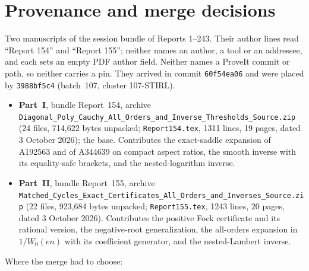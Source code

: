 \documentclass[11pt,letterpaper]{article}
\numberwithin{equation}{section}
\theoremstyle{definition}\newtheorem{definition}[theorem]{Definition}
\theoremstyle{remark}\newtheorem{remark}[theorem]{Remark}
\newcommand{\file}[1]{\nolinkurl{#1}}
\begin{document}
\section*{Provenance and merge decisions}\label{sfp:sec:provenance}
Two manuscripts of the session bundle of Reports 1--243. Their author lines read ``Report 154'' and ``Report 155''; neither names an author, a tool or an addressee, and each sets an empty PDF author field. Neither names a ProveIt commit or path, so neither carries a pin. They arrived in commit \texttt{60f54ea06} and were placed by \texttt{3988bf5c4} (batch~107, cluster 107-STIRL).
\begin{itemize}
\item \textbf{Part~I}, bundle Report~154, archive \file{Diagonal_Poly_Cauchy_All_Orders_and_Inverse_Thresholds_Source.zip} (24 files, 714,622 bytes unpacked; \file{Report154.tex}, 1311 lines, 19 pages, dated 3 October 2026); the base. Contributes the exact-saddle expansion of A192563 and of A344639 on compact aspect ratios, the smooth inverse with its equality-safe brackets, and the nested-logarithm inverse.
\item \textbf{Part~II}, bundle Report~155, archive \file{Matched_Cycles_Exact_Certificates_All_Orders_and_Inverses_Source.zip} (22 files, 923,684 bytes unpacked; \file{Report155.tex}, 1243 lines, 20 pages, dated 3 October 2026). Contributes the positive Fock certificate and its rational version, the negative-root generalization, the all-orders expansion in $1/W_0(en)$ with its coefficient generator, and the nested-Lambert inverse.
\end{itemize}
Where the merge had to choose:
\end{document}
